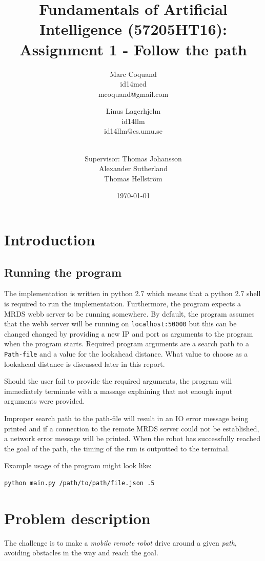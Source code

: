 \documentclass[12pt]{article}
\title{Fundamentals of Artificial Intelligence (57205HT16): Assignment 1 -
Follow the path}
\author{
    Marc Coquand \\ 
    id14mcd \\
    mcoquand@gmail.com \and
		Linus Lagerhjelm \\
		id14llm \\
		id14llm@cs.umu.se \and \\
		Supervisor: Thomas Johansson\\
		Alexander Sutherland \\
		Thomas Hellström
}
\date{\today}
\begin{document}
\maketitle

\newpage
\tableofcontents

\newpage
\section{Introduction}

\subsection{Running the program}

The implementation is written in python 2.7 which means that a python 2.7 shell
is required to run the implementation. Furthermore, the program expects a MRDS
webb server to be running somewhere. By default, the program assumes that the
webb server will be running on \texttt{localhost:50000} but this can be changed
changed by providing a new IP and port as arguments to the program when the
program starts. Required program arguments are a search path to a
\texttt{Path-file} and a value for the lookahead distance. What value to choose
as a lookahead distance is discussed later in this report.

Should the user fail to provide the required arguments, the program will
immediately terminate with a massage explaining that not enough input
arguments were provided.

Improper search path to the path-file will result in an IO error message
being printed and if a connection to the remote MRDS server could not
be established, a network error message will be printed. When the robot
has successfully reached the goal of the path, the timing of the run is
outputted to the terminal.

Example usage of the program might look like:
\begin{verbatim}
python main.py /path/to/path/file.json .5
\end{verbatim}

\section{Problem description}

The challenge is to make a \textit{mobile remote robot} drive around a given
\textit{path}, avoiding obstacles in the way and reach the goal. 
\end{document}
